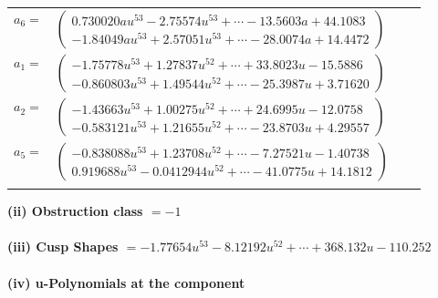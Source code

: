\documentclass[1p]{elsarticle_modified}
\theoremstyle{definition}
\begin{document}
\begin{tabular}{m{7pt} m{180pt} m{7pt} m{180pt} }
\flushright $a_{6}=$&$\begin{pmatrix}0.730020 a u^{53}-2.75574 u^{53}+\cdots-13.5603 a+44.1083\\-1.84049 a u^{53}+2.57051 u^{53}+\cdots-28.0074 a+14.4472\end{pmatrix}$ \\
\flushright $a_{1}=$&$\begin{pmatrix}-1.75778 u^{53}+1.27837 u^{52}+\cdots+33.8023 u-15.5886\\-0.860803 u^{53}+1.49544 u^{52}+\cdots-25.3987 u+3.71620\end{pmatrix}$ \\
\flushright $a_{2}=$&$\begin{pmatrix}-1.43663 u^{53}+1.00275 u^{52}+\cdots+24.6995 u-12.0758\\-0.583121 u^{53}+1.21655 u^{52}+\cdots-23.8703 u+4.29557\end{pmatrix}$ \\
\flushright $a_{5}=$&$\begin{pmatrix}-0.838088 u^{53}+1.23708 u^{52}+\cdots-7.27521 u-1.40738\\0.919688 u^{53}-0.0412944 u^{52}+\cdots-41.0775 u+14.1812\end{pmatrix}$\\&\end{tabular}
\flushleft \textbf{(ii) Obstruction class $= -1$}\\~\\
\flushleft \textbf{(iii) Cusp Shapes $= -1.77654 u^{53}-8.12192 u^{52}+\cdots+368.132 u-110.252$}\\~\\
\newpage\renewcommand{\arraystretch}{1}
\flushleft \textbf{(iv) u-Polynomials at the component}\newline \\
\end{document}
